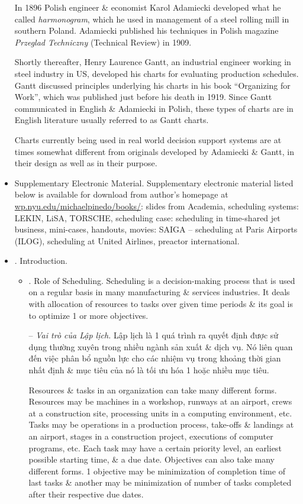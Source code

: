 \documentclass{article}
\begin{document}
\begin{itemize}
    In 1896 Polish engineer \& economist {\sc Karol Adamiecki} developed what he called {\it harmonogram}, which he used in management of a steel rolling mill in southern Poland. {\sc Adamiecki} published his techniques in Polish magazine {\it Przeglad Techniczny} (Technical Review) in 1909.
    
    Shortly thereafter, {\sc Henry Laurence Gantt}, an industrial engineer working in steel industry in US, developed his charts for evaluating production schedules. {\sc Gantt} discussed principles underlying his charts in his book ``Organizing for Work'', which was published just before his death in 1919. Since {\sc Gantt} communicated in English \& {\sc Adamiecki} in Polish, these types of charts are in English literature usually referred to as Gantt charts.
    
    Charts currently being used in real world decision support systems are at times somewhat different from originals developed by {\sc Adamiecki \& Gantt}, in their design as well as in their purpose.
    \item {\sf Supplementary Electronic Material.} Supplementary electronic material listed below is available for download from author's homepage at \url{wp.nyu.edu/michaelpinedo/books/}: slides from Academia, scheduling systems: LEKIN, LiSA, TORSCHE, scheduling case: scheduling in time-shared jet business, mini-cases, handouts, movies: SAIGA -- scheduling at Paris Airports (ILOG), scheduling at United Airlines, preactor international.
    \item {. Introduction.}
    \begin{itemize}
        \item {. Role of Scheduling.} Scheduling is a decision-making process that is used on a regular basis in many manufacturing \& services industries. It deals with allocation of resources to tasks over given time periods \& its goal is to optimize 1 or more objectives.
        
        -- {\it Vai trò của Lập lịch.} Lập lịch là 1 quá trình ra quyết định được sử dụng thường xuyên trong nhiều ngành sản xuất \& dịch vụ. Nó liên quan đến việc phân bổ nguồn lực cho các nhiệm vụ trong khoảng thời gian nhất định \& mục tiêu của nó là tối ưu hóa 1 hoặc nhiều mục tiêu.
        
        Resources \& tasks in an organization can take many different forms. Resources may be machines in a workshop, runways at an airport, crews at a construction site, processing units in a computing environment, etc. Tasks may be operations in a production process, take-offs \& landings at an airport, stages in a construction project, executions of computer programs, etc. Each task may have a certain priority level, an earliest possible starting time, \& a due date. Objectives can also take many different forms. 1 objective may be minimization of completion time of last tasks \& another may be minimization of number of tasks completed after their respective due dates.
        

\end{itemize}
\end{itemize}
\end{document}
